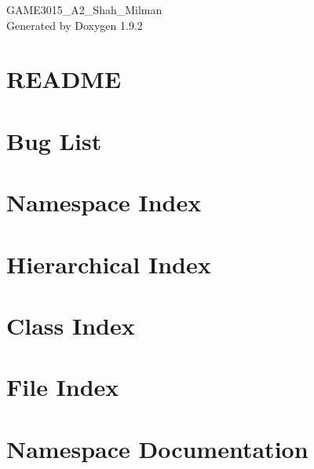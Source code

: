 \documentclass[twoside]{book}
\newcommand{\+}{\discretionary{\mbox{\scriptsize$\hookleftarrow$}}{}{}}
\newcommand{\clearemptydoublepage}{%
    \newpage{\pagestyle{empty}\cleardoublepage}%
  }
\begin{document}
  \raggedbottom
    \hypersetup{pageanchor=false,
                bookmarksnumbered=true,
                pdfencoding=unicode
               }
  \begin{titlepage}
  \vspace*{7cm}
  \begin{center}%
  {\Large GAME3015\+\_\+\+A2\+\_\+\+Shah\+\_\+\+Milman}\\
  \vspace*{1cm}
  {\large Generated by Doxygen 1.9.2}\\
  \end{center}
  \end{titlepage}
  \clearemptydoublepage
  \tableofcontents
  \clearemptydoublepage
  \hypersetup{pageanchor=true}
\chapter{README}
\label{md__h___g_a_m_e3015__g_a_m_e3015__a2__shah__milman__r_e_a_d_m_e}

\chapter{Bug List}
\label{bug}

\chapter{Namespace Index}

\chapter{Hierarchical Index}

\chapter{Class Index}

\chapter{File Index}

\chapter{Namespace Documentation}


\end{document}
